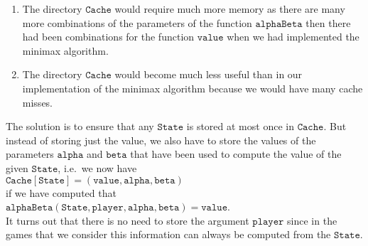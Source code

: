\begin{enumerate}
\item The directory $\mathtt{Cache}$ would require much more memory as there are many more combinations of the parameters
      of the function $\texttt{alphaBeta}$ then there had been combinations for the function $\mathtt{value}$ when
      we had implemented the minimax algorithm.  
\item The directory $\texttt{Cache}$ would become much less useful than in our implementation of the minimax
      algorithm because we would have many cache misses.  
\end{enumerate}
The solution is to ensure that any $\mathtt{State}$ is stored at most once in $\mathtt{Cache}$.  But instead of storing just the
value, we also have to store the values of the parameters $\mathtt{alpha}$ and $\mathtt{beta}$ that have been
used to compute the value of the given $\mathtt{State}$, i.e.~we now have
\\[0.2cm]
\hspace*{1.3cm}
$\mathtt{Cache}[\mathtt{State}] = (\mathtt{value}, \mathtt{alpha}, \mathtt{beta})$
\\[0.2cm]
if we have computed that
\\[0.2cm]
\hspace*{1.3cm}
$\mathtt{alphaBeta}(\mathtt{State}, \mathtt{player}, \mathtt{alpha}, \mathtt{beta}) = \mathtt{value}$.
\\[0.2cm]
It turns out that there is no need to store the argument $\mathtt{player}$ since in the games that we consider
this information can always be computed from the $\mathtt{State}$.

